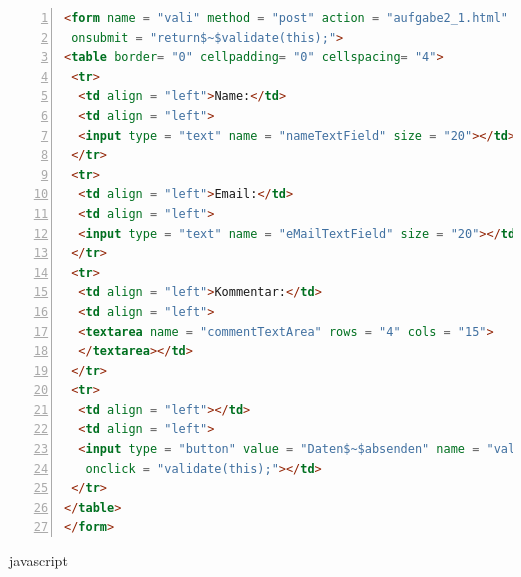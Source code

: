 \documentclass{beamer}
\begin{document}
\tiny{
\begin{lstlisting}[language = HTML,
				   mathescape = true, 
                   morekeywords = {onsubmit, onclick, this, return}, 
                   numbers = left, 
                   numbersep = 3pt]
 <form name = "vali" method = "post" action = "aufgabe2_1.html"
 onsubmit = "return$~$validate(this);">
<table border= "0" cellpadding= "0" cellspacing= "4">
 <tr>
  <td align = "left">Name:</td>
  <td align = "left">
  <input type = "text" name = "nameTextField" size = "20"></td>
 </tr>
 <tr>
  <td align = "left">Email:</td>
  <td align = "left">
  <input type = "text" name = "eMailTextField" size = "20"></td>
 </tr>
 <tr>
  <td align = "left">Kommentar:</td>
  <td align = "left">
  <textarea name = "commentTextArea" rows = "4" cols = "15">
  </textarea></td>
 </tr>
 <tr>
  <td align = "left"></td>
  <td align = "left">
  <input type = "button" value = "Daten$~$absenden" name = "validateButton" 
   onclick = "validate(this);"></td>
 </tr>
</table>
</form>
\end{lstlisting}}

\begin{frame}{javascript}
\end{frame}
\end{document}

